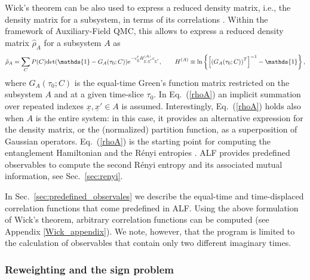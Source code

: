 Wick's theorem can be also used to express a reduced density matrix, i.e., the density matrix for a subsystem, in terms of its correlations \cite{Peschel03}.
Within the framework of Auxiliary-Field QMC, this allows to express a reduced density matrix $\hat{\rho}_A$ for a subsystem $A$ as \cite{Grover13}
\begin{equation}
\hat{\rho}_A = \sum_C P(C){\rm det}(\mathds{1}-G_A(\tau_0; C))e^{-c^{\dagger}_{\underline x} H^{(A)}_{{\underline x}, {\underline x}'}c^{\phantom\dagger}_{{\underline x}'}},\qquad H^{(A)} \equiv \ln\left\{\left[\left(G_A(\tau_0; C)\right)^T\right]^{-1}-\mathds{1}\right\},
\label{rhoA}
\end{equation}
where $G_A(\tau_0; C)$ is the equal-time Green's function matrix restricted on the subsystem $A$ and at a given time-slice $\tau_0$. In Eq.~(\ref{rhoA}) an implicit summation over repeated indexes ${\underline x}, {\underline x}' \in A$ is assumed.
Interestingly, Eq.~(\ref{rhoA}) holds also when $A$ is the entire system: in this case, it provides an alternative expression for the density matrix, or the (normalized) partition function, as a superposition of Gaussian operators.
Eq.~(\ref{rhoA}) is the starting point for computing the entanglement Hamiltonian \cite{Toldin18} and the R\'enyi entropies \cite{Grover13,Assaad13a,Assaad15}. ALF provides predefined observables to compute the second R\'enyi entropy and its associated mutual information, see Sec.~\ref{sec:renyi}.


In Sec.~\ref{sec:predefined_observales} we describe the equal-time and time-displaced correlation functions that come predefined in ALF.
Using the  above  formulation  of  Wick's theorem, arbitrary  correlation functions can be computed (see Appendix \ref{Wick_appendix}). We note, however, that the program is limited to the calculation of observables that contain only two different imaginary times.  

\subsubsection{Reweighting and the sign problem}\label{sec:reweight}

